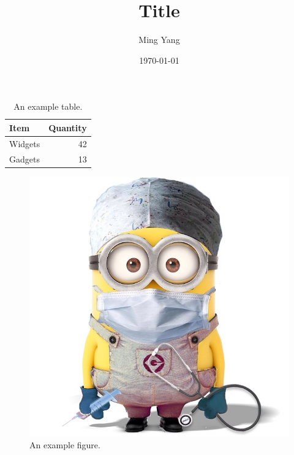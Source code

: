 \documentclass{article}
\begin{document}
\title{\textsf{Title}}
\author{Ming Yang}
\date{\today}
\maketitle



\begin{table}[H]
\centering
\begin{tabular}{l|r}
Item & Quantity \\\hline
Widgets & 42 \\
Gadgets & 13
\end{tabular}
\caption{\label{tab:widgets}An example table.}
\end{table}


\begin{figure}[H]
\begin{center}
\includegraphics[scale=0.2]{figure.jpg}
\caption{An example figure.}
\end{center}
\end{figure}
\end{document}
